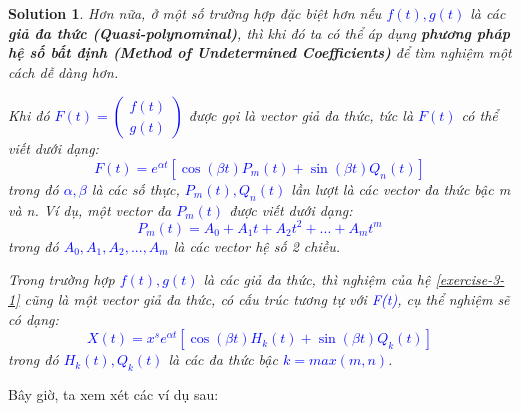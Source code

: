 \documentclass[a4paper]{article}
\newtheorem*{sol}{Solution}
\begin{document}
\begin{sol}
\hspace{1cm }Hơn nữa, ở một số trường hợp đặc biệt hơn nếu \textcolor{blue}{$f(t), g(t)$} là các \textbf{\textit{giả đa thức (Quasi-polynominal)}}, thì khi đó ta có thể áp dụng \textbf{\textit{phương pháp hệ số bất định (Method of Undetermined Coefficients)}} để tìm nghiệm một cách dễ dàng hơn. 

\hspace{1cm} Khi đó \textcolor{blue}{$F(t) = \begin{pmatrix}
    f(t) \\
    g(t)
\end{pmatrix}$} được gọi là vector giả đa thức, tức là \textcolor{blue}{$F(t)$} có thể viết dưới dạng: 
\textcolor{blue}{$$ F(t) = e^{\alpha t} [\cos{(\beta t)}P_m(t) + \sin{(\beta t)} Q_n(t)]$$}
trong đó \textcolor{blue}{$\alpha, \beta$} là các số thực, \textcolor{blue}{$P_m(t), Q_n(t)$} lần lượt là các vector đa thức bậc m và n. Ví dụ, một vector đa \textcolor{blue}{$P_m(t)$} được viết dưới dạng: 
\textcolor{blue}{$$P_m(t) = A_0 + A_1 t + A_2 t^{2}+ ... + A_m t^{m} $$}
trong đó \textcolor{blue}{$A_0, A_1, A_2,..., A_m$} là các vector hệ số 2 chiều. 

\hspace{1cm} Trong trường hợp \textcolor{blue}{$f(t), g(t)$} là các \textit{giả đa thức}, thì nghiệm của hệ \textcolor{blue}{\eqref{exercise-3-1}} cũng là một vector giả đa thức, có cấu trúc tương tự với \textcolor{blue}{F(t)}, cụ thể nghiệm sẽ có dạng: 
\textcolor{blue}{$$X(t) = x^{s}e^{\alpha t}[\cos{(\beta t)} H_k(t) + \sin{(\beta t)} Q_k(t)]$$} 
trong đó \textcolor{blue}{$H_k(t), Q_k(t)$} là các đa thức bậc \textcolor{blue}{$k = max(m, n)$}. 
\end{sol} 
Bây giờ, ta xem xét các ví dụ sau:
\end{document}
